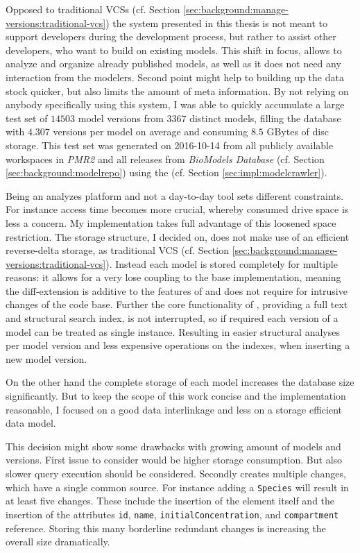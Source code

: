 
Opposed to traditional VCSs (cf. Section \ref{sec:background:manage-versions:traditional-vcs}) the system presented in this thesis is not meant to support developers during the development process, but rather to assist other developers, who want to build on existing models.
This shift in focus, allows to analyze and organize already published models, as well as it does not need any interaction from the modelers. Second point might help to building up the data stock quicker, but also limits the amount of meta information.
By not relying on anybody specifically using this system, I was able to quickly accumulate a large test set of $14503$ model versions from $3367$ distinct models, filling the database with $4.307$ versions per model on average and consuming $8.5$ GBytes of disc storage.
This test set was generated on 2016-10-14 from all publicly available workspaces in \emph{PMR2} and all releases from \emph{BioModels Database} (cf. Section \ref{sec:background:modelrepo}) using the \modelcrawler (cf. Section \ref{sec:impl:modelcrawler}).

Being an analyzes platform and not a day-to-day tool sets different constraints. For instance access time becomes more crucial, whereby consumed drive space is less a concern.
My implementation takes full advantage of this loosened space restriction.
The storage structure, I decided on, does not make use of an efficient reverse-delta storage, as traditional VCS (cf. Section \ref{sec:background:manage-versions:traditional-vcs}). Instead each model is stored completely for multiple reasons: it allows for a very lose coupling to the base \masymos implementation, meaning the diff-extension is additive to the features of \masymos and does not require for intrusive changes of the code base. Further the core functionality of \masymos, providing a full text and structural search index, is not interrupted, so if required each version of a model can be treated as single instance. Resulting in easier structural analyses per model version and less expensive operations on the indexes, when inserting a new model version.

On the other hand the complete storage of each model increases the database size significantly. But to keep the scope of this work concise and the implementation reasonable, I focused on a good data interlinkage and less on a storage efficient data model.

This decision might show some drawbacks with growing amount of models and versions.
First issue to consider would be higher storage consumption. But also slower query execution should be considered.
Secondly \bives creates multiple changes, which have a single common source. For instance adding a \texttt{Species} will result in at least five changes. These include the insertion of the element itself and the insertion of the attributes \texttt{id}, \texttt{name}, \texttt{initialConcentration}, and \texttt{compartment} reference.
Storing this many borderline redundant changes is increasing the overall size dramatically.

